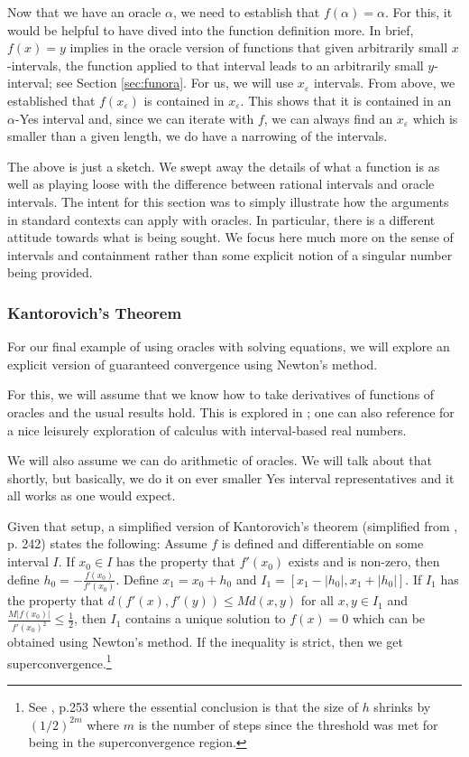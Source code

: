 \documentclass[12pt]{article}
\begin{document}
Now that we have an oracle  $\alpha$, we need to establish that $f(\alpha) = \alpha$. For this, it would be helpful to have dived into the function definition more. In brief, $f(x) = y$ implies in the oracle version of functions that given arbitrarily small $x$-intervals, the function applied to that interval leads to an arbitrarily small $y$-interval; see Section \ref{sec:funora}. For us, we will use $x_\varepsilon$ intervals. From above, we established that $f(x_\varepsilon)$ is contained in $x_\varepsilon$. This shows that it is contained in an $\alpha$-Yes interval and, since we can iterate with $f$, we can always find an $x_\varepsilon$ which is smaller than a given length, we do have a narrowing of the intervals. 

The above is just a sketch. We swept away the details of what a function is as well as playing loose with the difference between rational intervals and oracle intervals. The intent for this section was to simply illustrate how the arguments in standard contexts can apply with oracles. In particular, there is a different attitude towards what is being sought. We focus here much more on the sense of intervals and containment rather than some explicit notion of a singular number being provided. 


\subsubsection{Kantorovich's Theorem}

For our final example of using oracles with solving equations, we will explore an explicit version of guaranteed convergence using Newton's method. 

For this, we will assume that we know how to take derivatives of functions of oracles and the usual results hold. This is explored in \cite{taylor23funora}; one can also reference \cite{bridger} for a nice leisurely exploration of calculus with interval-based real numbers. 

We will also assume we can do arithmetic of oracles. We will talk about that shortly, but basically, we do it on ever smaller Yes interval representatives and it all works as one would expect. 

Given that setup, a simplified version of Kantorovich's theorem (simplified from \cite{hubbard}, p. 242) states the following:
Assume $f$ is defined and differentiable on some interval $I$.  If $x_0\in I$ has the property that $f'(x_0)$ exists and is non-zero, then define $h_0 = -\frac{f(x_0)}{f'(x_0)}$. Define $x_1 = x_0 + h_0$ and $I_1 = [x_1-|h_0|, x_1 + |h_0|]$. If $I_1$ has the property that $d(f'(x), f'(y)) \leq M d(x, y)$ for all $x, y \in I_1$ and $\frac{M|f(x_0)|}{f'(x_0)^2} \leq \frac{1}{2}$, then $I_1$ contains a unique solution to $f(x) = 0$ which can be obtained using Newton's method. If the inequality is strict, then we get superconvergence.\footnote{See \cite{hubbard}, p.253 where the essential conclusion is that the size of $h$ shrinks by $(1/2)^{2m}$ where $m$ is the number of steps since the threshold was met for being in the superconvergence region.} 
\end{document}
